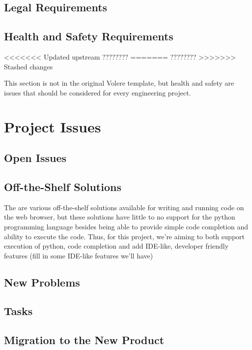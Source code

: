 \documentclass[12pt, titlepage]{article}
\begin{document}
  \subsection{Legal Requirements}

  \subsection{Health and Safety Requirements}
<<<<<<< Updated upstream
  {\huge ????????}
=======
  \Huge ????????
>>>>>>> Stashed changes

  This section is not in the original Volere template, but health and safety are
  issues that should be considered for every engineering project.

\section{Project Issues}

  \subsection{Open Issues}

  \subsection{Off-the-Shelf Solutions}
  The are various off-the-shelf solutions available for writing and running
  code on the web browser, but these solutions have little to no support for
  the python programming language besides being able to provide simple code
  completion and ability to execute the code. Thus, for this project, we're
  aiming to both support execution of python, code completion and add IDE-like,
  developer friendly features ({\Huge fill in some IDE-like features we'll
  have})

  \subsection{New Problems}

  \subsection{Tasks}

  \subsection{Migration to the New Product}
\end{document}
